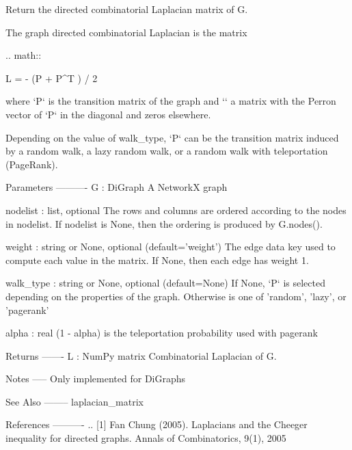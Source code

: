 \begin{DoxyVerb}Return the directed combinatorial Laplacian matrix of G.

The graph directed combinatorial Laplacian is the matrix

.. math::

    L = \Phi - (\Phi P + P^T \Phi) / 2

where `P` is the transition matrix of the graph and `\Phi` a matrix
with the Perron vector of `P` in the diagonal and zeros elsewhere.

Depending on the value of walk_type, `P` can be the transition matrix
induced by a random walk, a lazy random walk, or a random walk with
teleportation (PageRank).

Parameters
----------
G : DiGraph
   A NetworkX graph

nodelist : list, optional
   The rows and columns are ordered according to the nodes in nodelist.
   If nodelist is None, then the ordering is produced by G.nodes().

weight : string or None, optional (default='weight')
   The edge data key used to compute each value in the matrix.
   If None, then each edge has weight 1.

walk_type : string or None, optional (default=None)
   If None, `P` is selected depending on the properties of the
   graph. Otherwise is one of 'random', 'lazy', or 'pagerank'

alpha : real
   (1 - alpha) is the teleportation probability used with pagerank

Returns
-------
L : NumPy matrix
  Combinatorial Laplacian of G.

Notes
-----
Only implemented for DiGraphs

See Also
--------
laplacian_matrix

References
----------
.. [1] Fan Chung (2005).
   Laplacians and the Cheeger inequality for directed graphs.
   Annals of Combinatorics, 9(1), 2005
\end{DoxyVerb}
 \mbox{\label{namespacenetworkx_1_1linalg_1_1laplacianmatrix_accd9ad151a806626d9a2577168a2fb42}} 
